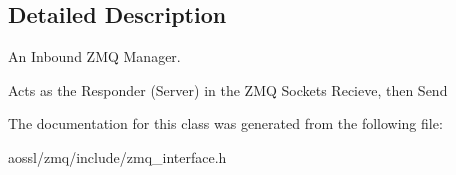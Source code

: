 \subsection{Detailed Description}
An Inbound Z\+MQ Manager. 

Acts as the Responder (Server) in the Z\+MQ Sockets Recieve, then Send 

The documentation for this class was generated from the following file\+:\begin{DoxyCompactItemize}
\item 
aossl/zmq/include/zmq\+\_\+interface.\+h\end{DoxyCompactItemize}
